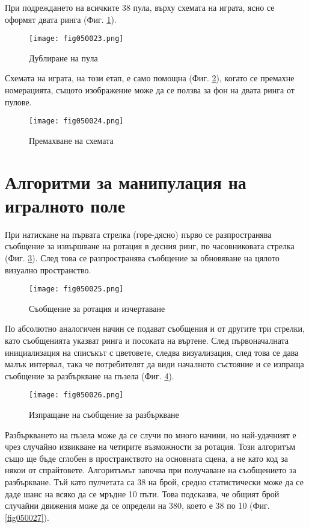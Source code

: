 При подреждането на всичките 38 пула, върху схемата на играта, ясно се оформят двата ринга (Фиг. \ref{fig050023}).

\begin{figure}[H]
  \centering
  \texttt{[image: fig050023.png]}
  \caption{Дублиране на пула}
\label{fig050023}
\end{figure}

Схемата на играта, на този етап, е само помощна (Фиг. \ref{fig050024}), когато се премахне номерацията, същото изображение може да се ползва за фон на двата ринга от пулове.

\begin{figure}[H]
  \centering
  \texttt{[image: fig050024.png]}
  \caption{Премахване на схемата}
\label{fig050024}
\end{figure}

\section{Алгоритми за манипулация на игралното поле}

При натискане на първата стрелка (горе-дясно) първо се разпространява съобщение за извършване на ротация в десния ринг, по часовниковата стрелка (Фиг. \ref{fig050025}). След това се разпространява съобщение за обновяване на цялото визуално пространство.

\begin{figure}[H]
  \centering
  \texttt{[image: fig050025.png]}
  \caption{Съобщение за ротация и изчертаване}
\label{fig050025}
\end{figure}

По абсолютно аналогичен начин се подават съобщения и от другите три стрелки, като съобщенията указват ринга и посоката на въртене. След първоначалната инициализация на списъкът с цветовете, следва визуализация, след това се дава малък интервал, така че потребителят да види началното състояние и се изпраща съобщение за разбъркване на пъзела (Фиг. \ref{fig050026}).

\begin{figure}[H]
  \centering
  \texttt{[image: fig050026.png]}
  \caption{Изпращане на съобщение за разбъркване}
\label{fig050026}
\end{figure}

Разбъркването на пъзела може да се случи по много начини, но най-удачният е чрез случайно извикване на четирите възможности за ротация. Този алгоритъм също ще бъде сглобен в пространството на основната сцена, а не като код за някои от спрайтовете. Алгоритъмът започва при получаване на съобщението за разбъркване. Тъй като пулчетата са 38 на брой, средно статистически може да се даде шанс на всяко да се мръдне 10 пъти. Това подсказва, че общият брой случайни движения може да се определи на 380, което е 38 по 10 (Фиг. \ref{fig050027}).

